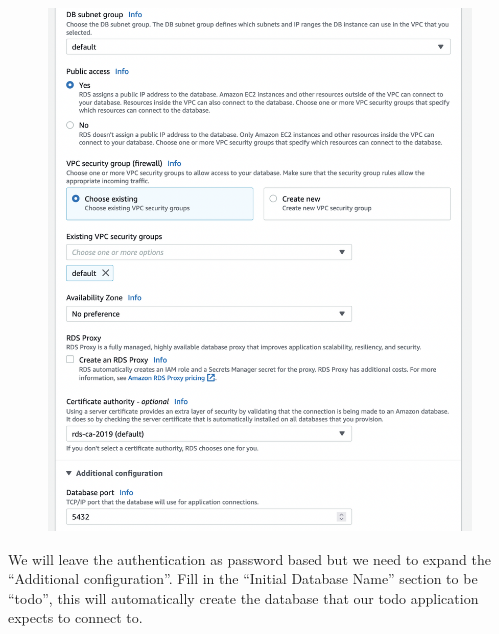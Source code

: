 \documentclass{csse4400}
\begin{document}
\begin{figure}[H]
  \includegraphics[width=\textwidth]{images/db6}
\end{figure}

We will leave the authentication as password based but we need to expand the ``Additional configuration''.
Fill in the ``Initial Database Name'' section to be ``todo'',
this will automatically create the database that our todo application expects to connect to.

\end{document}
